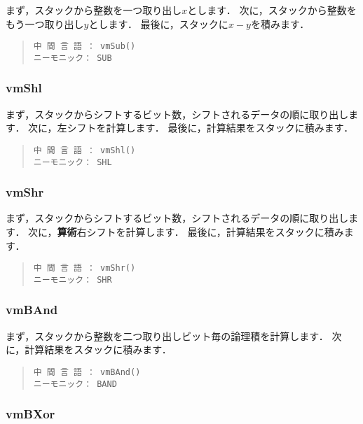 まず，スタックから整数を一つ取り出し$x$とします．
次に，スタックから整数をもう一つ取り出し$y$とします．
最後に，スタックに$x-y$を積みます．

\begin{quote}
\begin{verbatim}
中 間 言 語 ： vmSub()
ニーモニック： SUB
\end{verbatim}
\end{quote}

\subsubsection{vmShl}

まず，スタックからシフトするビット数，シフトされるデータの順に取り出します．
次に，左シフトを計算します．
最後に，計算結果をスタックに積みます．

\begin{quote}
\begin{verbatim}
中 間 言 語 ： vmShl()
ニーモニック： SHL
\end{verbatim}
\end{quote}

\subsubsection{vmShr}

まず，スタックからシフトするビット数，シフトされるデータの順に取り出します．
次に，{\bf 算術}右シフトを計算します．
最後に，計算結果をスタックに積みます．

\begin{quote}
\begin{verbatim}
中 間 言 語 ： vmShr()
ニーモニック： SHR
\end{verbatim}
\end{quote}

\subsubsection{vmBAnd}

まず，スタックから整数を二つ取り出しビット毎の論理積を計算します．
次に，計算結果をスタックに積みます．

\begin{quote}
\begin{verbatim}
中 間 言 語 ： vmBAnd()
ニーモニック： BAND
\end{verbatim}
\end{quote}

\subsubsection{vmBXor}

